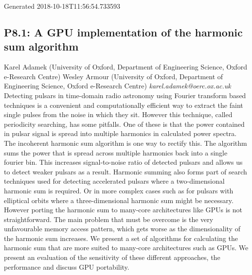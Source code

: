 \documentclass{report}
\begin{document}
           Generated 2018-10-18T11:56:54.733593\newline

\subsection*{P8.1: A GPU implementation of the harmonic sum algorithm}
\bigskip
Karel Adamek (University of Oxford, Department of Engineering Science, Oxford e-Research Centre) \newline Wesley Armour (University of Oxford, Department of Engineering Science, Oxford e-Research Centre) \newline   \newline   \newline  \newline  \newline\newline
{\it karel.adamek@oerc.ox.ac.uk}\newline
\newline\newline
Detecting pulsars in time-domain radio astronomy using Fourier transform based techniques is a convenient and computationally efficient way to extract the faint single pulses from the noise in which they sit. However this technique, called periodicity searching, has some pitfalls. One of these is that the power contained in pulsar signal is spread into multiple harmonics in calculated power spectra. The incoherent harmonic sum algorithm is one way to rectify this. The algorithm sums the power that is spread across multiple harmonics back into a single fourier bin. This increases signal-to-noise ratio of detected pulsars and allows us to detect weaker pulsars as a result. Harmonic summing also forms part of search techniques used for detecting accelerated pulsars where a two-dimensional harmonic sum is required. Or in more complex cases such as for pulsars with elliptical orbits where a three-dimensional harmonic sum might be necessary. However porting the harmonic sum to many-core architectures like GPUs is not straightforward. The main problem that must be overcome is the very unfavourable memory access pattern, which gets worse as the dimensionality of the harmonic sum increases. We present a set of algorithms for calculating the harmonic sum that are more suited to many-core architectures such as GPUs. We present an evaluation of the sensitivity of these different approaches, the performance and discuss GPU portability.\newline
\newpage
\end{document}
